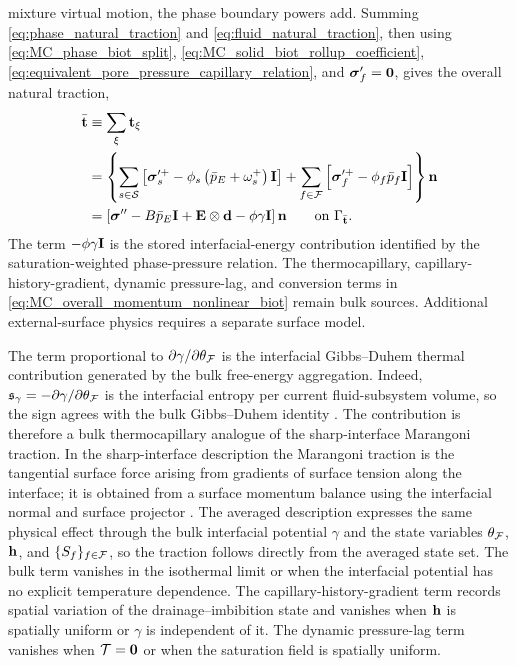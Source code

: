 mixture virtual motion, the phase boundary powers add.  Summing
\eqref{eq:phase_natural_traction} and
\eqref{eq:fluid_natural_traction}, then using
\eqref{eq:MC_phase_biot_split},
\eqref{eq:MC_solid_biot_rollup_coefficient},
\eqref{eq:equivalent_pore_pressure_capillary_relation}, and
\(\boldsymbol{\sigma}_f'=\mathbf{0}\), gives the overall natural traction,
%
\begin{align}
	\bar{\mathbf{t}}
	&\equiv
	\sum_\xi\mathbf{t}_\xi \notag\\
	&=
	\left\{
	\sum_{s\in\mathcal{S}}
	\left[
	\boldsymbol{\sigma}_s^{\prime+}
	-\phi_s
	\left(
	\bar p_E+\omega_s^+
	\right)\mathbf{I}
	\right]
	+\sum_{f\in\mathcal{F}}
	\left[
	\boldsymbol{\sigma}_f^{\prime+}
	-\phi_f\bar p_f\mathbf{I}
	\right]
	\right\}\mathbf{n}
	\notag\\
	&=
	\left[
		\boldsymbol{\sigma}^{\prime\prime}
		-
		B\bar p_E\mathbf{I}
		+
		\mathbf{E}\otimes\mathbf{d}
		-
		\phi\gamma\mathbf{I}
	\right]\mathbf{n}
	\qquad
	\text{on }\Gamma_{\bar{\mathbf{t}}} .
	\label{eq:overall_natural_traction}
\end{align}
%
The term \(-\phi\gamma\mathbf{I}\) is the stored interfacial-energy contribution
identified by the saturation-weighted phase-pressure relation.  The
thermocapillary, capillary-history-gradient, dynamic pressure-lag, and conversion
terms in \eqref{eq:MC_overall_momentum_nonlinear_biot} remain bulk sources.
Additional external-surface physics requires a separate surface model.

The term proportional to
\(\partial\gamma/\partial\theta_{\mathcal{F}}\)
is the interfacial Gibbs--Duhem thermal contribution generated by the bulk
free-energy aggregation.  Indeed,
\(\mathfrak{s}_\gamma=-\partial\gamma/\partial\theta_{\mathcal{F}}\)
is the interfacial entropy per current fluid-subsystem volume, so the sign agrees with
the bulk Gibbs--Duhem identity
\cite[eq.~(59)]{bothe2015continuum}.  The contribution is therefore a bulk
thermocapillary analogue of the sharp-interface Marangoni traction.  In the
sharp-interface description the Marangoni traction is the tangential surface
force arising from gradients of surface tension along the interface; it is
obtained from a surface momentum balance using the interfacial normal and
surface projector
\cite{jasnow1996thermocapillary,guo2015thermocapillary}.  The averaged
description expresses the same physical effect through the bulk interfacial
potential \(\gamma\) and the state variables \(\theta_{\mathcal{F}}\), \(\mathbf{h}\),
and \(\{S_f\}_{f\in\mathcal{F}}\), so the traction follows directly from the averaged
state set.  The bulk term vanishes in the isothermal limit or when the
interfacial potential has no explicit temperature dependence.  The
capillary-history-gradient term records spatial variation of the
drainage--imbibition state and vanishes when \(\mathbf{h}\) is spatially uniform
or \(\gamma\) is independent of it.  The dynamic pressure-lag term vanishes
when \(\mathcal{T}=\mathbf{0}\) or when the saturation field is spatially uniform.


